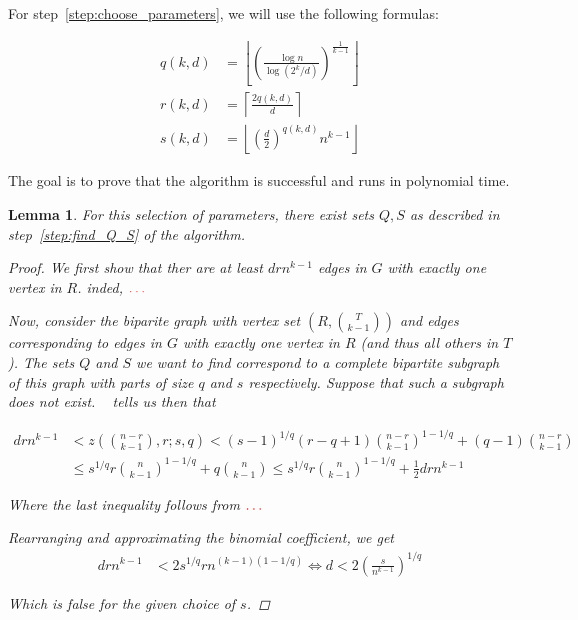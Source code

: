 \documentclass[12pt]{article}
\newtheorem{lemma}[thm]{Lemma}
\begin{document}
    For step~\ref{step:choose_parameters}, we will use the following formulas:

    \begin{align*}
            q(k, d) &= \left\lfloor \left(  \frac{\log n}{\log (2^k/d)} \right)^{\frac{1}{k-1}} \right\rfloor \\
            r(k, d) &= \left \lceil \frac{2q(k, d)}{d} \right \rceil \\
            s(k, d) &= \left\lfloor \left( \frac{d}{2} \right)^{q(k, d)} n^{k-1} \right\rfloor
    \end{align*}

    The goal is to prove that the algorithm is successful and runs in polynomial time.

    \begin{lemma}\label{lemma:q_s}
        For this selection of parameters,
        there exist sets $Q, S$ as described in step~\ref{step:find_Q_S} of the algorithm.

        \begin{proof}
            We first show that ther are at least $drn^{k-1}$ edges in $G$ with exactly one vertex in $R$.
            inded, $\color{red}\ldots$ %

            Now, consider the biparite graph with vertex set $\left( R, \binom{T}{k-1} \right)$
            and edges corresponding to edges in $G$ with exactly one vertex in $R$ (and thus all others in $T$).
            The sets $Q$ and $S$ we want to find correspond to a complete bipartite subgraph of this graph
            with parts of size $q$ and $s$ respectively.
            Suppose that such a subgraph does not exist.
            ~\cite{Kovari1954} tells us then that

            \begin{align*}\label{eq:equation}
                drn^{k-1} & < z\left(\binom{n-r}{k-1}, r; s, q  \right) < (s-1)^{1/q}(r-q+1)\binom{n-r}{k-1}^{1-1/q} + (q-1)\binom{n-r}{k-1} \\
                           & \leq s^{1/q} r \binom{n}{k-1}^{1-1/q} + q \binom{n}{k-1} \leq s^{1/q} r \binom{n}{k-1}^{1-1/q} + \frac{1}{2} drn^{k-1}
            \end{align*}

            Where the last inequality follows from $\color{red} \ldots$

            Rearranging and approximating the binomial coefficient, we get
            \begin{align*}
                drn^{k-1} &< 2s^{1/q}r n^{(k-1)(1-1/q)} \iff d < 2 \left( \frac{s}{n^{k-1}} \right)^{1/q}
            \end{align*}

            Which is false for the given choice of $s$.

        \end{proof}

    \end{lemma}
\end{document}

